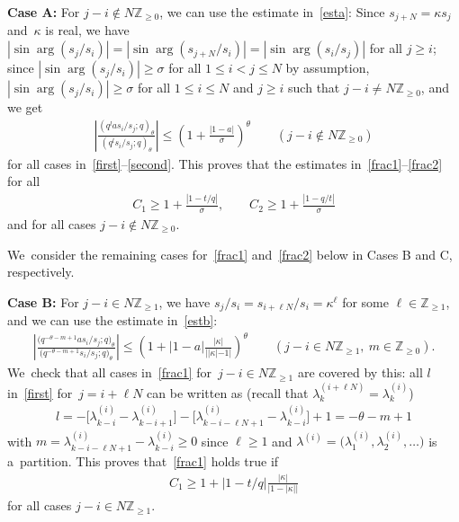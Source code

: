 \documentclass[pdftex]{sigma}%
\numberwithin{equation}{section}
\newcommand{\Z}{{\mathbb Z}}
\begin{document}
{\bf Case A:} For $j-i\notin N\Z_{\geq 0}$, we can use the estimate in~\eqref{esta}:
Since $s_{j+N}=\kappa s_j$ and~$\kappa$ is real, we have $|\sin\arg(s_j/s_i)|=|\sin\arg(s_{j+N}/s_i)|=|\sin\arg(s_i/s_j)|$ for all $j\geq i$;
since $|\sin\arg(s_j/s_i)|\geq \sigma$ for all $1\leq i<j\leq N$ by assumption, $|\sin\arg(s_j/s_i)|\geq \sigma$ for all $1\leq i\leq N$ and $j\geq i$ such that $j-i\neq N\Z_{\geq 0}$, and we get
\begin{gather*}
\left|\frac{(q^{l}as_i/s_j;q)_\theta}{(q^l s_i/s_j;q)_\theta}\right| \leq \left(1+\frac{|1-a|}{\sigma} \right)^\theta\qquad
(j-i\notin N\Z_{\geq 0})
\end{gather*}
for all cases in~\eqref{first}--\eqref{second}. This proves that the estimates in~\eqref{frac1}--\eqref{frac2} for all
\begin{gather}
\label{C1C2A}
C_1\geq 1+\frac{|1-t/q|}{\sigma},\qquad
C_2\geq 1+\frac{|1-q/t|}{\sigma}
\end{gather}
and for all cases $j-i\notin N\Z_{\geq 0}$.

We~consider the remaining cases for~\eqref{frac1} and~\eqref{frac2} below in Cases B and C, respectively.

{\bf Case B:} For $j-i\in N\Z_{\geq 1}$, we have $s_j/s_i = s_{i+\ell N}/s_i=\kappa^\ell$ for some $\ell\in\Z_{\geq 1}$, and we can use the estimate in~\eqref{estb}:
\begin{gather*}
\left|\frac{\big(q^{-\theta-m+1}as_i/s_j;q\big)_\theta}{\big(q^{-\theta-m+1} s_i/s_j;q\big)_\theta}\right|\leq \left(1+|1-a|\frac{|\kappa|}{||\kappa|-1|} \right)^\theta\qquad
(j-i\in N\Z_{\geq 1},\ m\in\Z_{\geq 0}).
\end{gather*}
We~check that all cases in~\eqref{frac1} for~$j-i\in N\Z_{\geq 1}$ are covered by this: all $l$ in~\eqref{first} for~$j=i+\ell N$ can be written as (recall that $\lambda^{(i+\ell N)}_k=\lambda^{(i)}_k$)
\begin{gather*}
l = -\big[\lambda^{(i)}_{k-i}- \lambda^{(i)}_{k-i+1}\big] - \big[\lambda^{(i)}_{k-i-\ell N+1}-\lambda^{(i)}_{k-i}\big]+1 = -\theta-m+1
\end{gather*}
with $m=\lambda^{(i)}_{k-i-\ell N+1}-\lambda^{(i)}_{k-i}\geq 0$ since $\ell\geq 1$ and $\lambda^{(i)}=\big(\lambda_1^{(i)},\lambda_2^{(i)},\dots\big)$ is a~partition.
This proves that~\eqref{frac1} holds true if
\begin{gather}
\label{C1C2B}
C_1\geq 1+|1-t/q|\frac{|\kappa|}{|1-|\kappa||}
\end{gather}
for all cases $j-i\in N\Z_{\geq 1}$.
\end{document}
